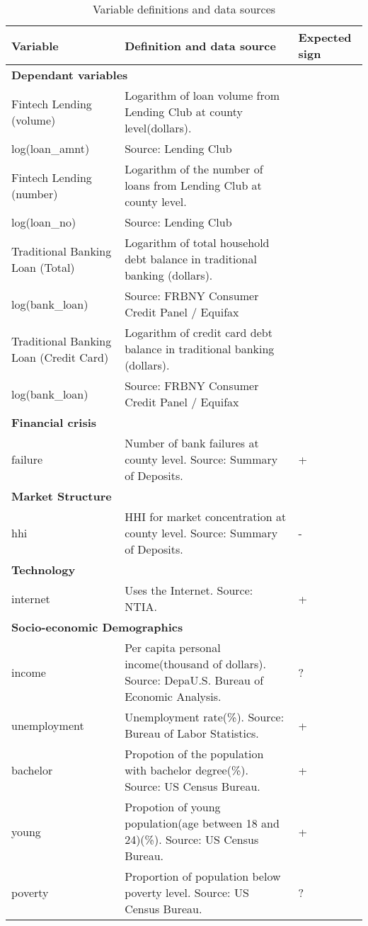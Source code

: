 \documentclass[11pt, a4paper, leqno]{article}
\begin{document}
\begin{table}[!h!]\centering \caption{Variable definitions and data sources \label{vardef}}
\begin{tabularx}{\linewidth}{|p{5cm}|p{8cm}|p{1.7cm}|}
\hline
\textbf{Variable} & \textbf{Definition and data source} & \textbf{Expected sign} \\ 
\hline
\multicolumn{3}{|l|}{\textbf{Dependant variables}} \\ 
\hline
Fintech Lending (volume) & Logarithm of loan volume from Lending Club at county level(dollars). &  \\
log(loan\_amnt) & Source: Lending Club &  \\ 
\hline
Fintech Lending (number)  & Logarithm of the number of loans from Lending Club at county level. &   \\
log(loan\_no) & Source: Lending Club &  \\
\hline
Traditional Banking Loan (Total) & Logarithm of total household debt balance in traditional banking (dollars).  &   \\ 
log(bank\_loan) & Source: FRBNY Consumer Credit Panel / Equifax &   \\ 
\hline
Traditional Banking Loan (Credit Card) & Logarithm of credit card debt balance in traditional banking (dollars).  &   \\ 
log(bank\_loan) & Source: FRBNY Consumer Credit Panel / Equifax &   \\ 
\hline
\multicolumn{3}{|l|}{\textbf{Financial crisis}} \\ \hline
failure & Number of bank failures at county level. Source: Summary of Deposits.&  + \\ \hline
\multicolumn{3}{|l|}{\textbf{Market Structure}} \\ \hline
hhi & HHI for market concentration at county level. Source: Summary of Deposits.&  - \\ \hline
\multicolumn{3}{|l|}{\textbf{Technology}} \\ \hline
internet & Uses the Internet. Source: NTIA. &  + \\ \hline
\multicolumn{3}{|l|}{\textbf{Socio-economic Demographics}} \\ \hline
income & Per capita personal income(thousand of dollars). Source: DepaU.S. Bureau of Economic Analysis. &  ? \\ \hline
unemployment & Unemployment rate(\%). Source: Bureau of Labor Statistics.&  + \\ \hline
bachelor & Propotion of the population with bachelor degree(\%). Source: US Census Bureau.&  + \\ \hline
young & Propotion of young population(age between 18 and 24)(\%). Source: US Census Bureau. &  + \\ \hline
poverty & Proportion of population below poverty level. Source: US Census Bureau. & ? \\ \hline
\end{tabularx}
\end{table}
\end{document}
